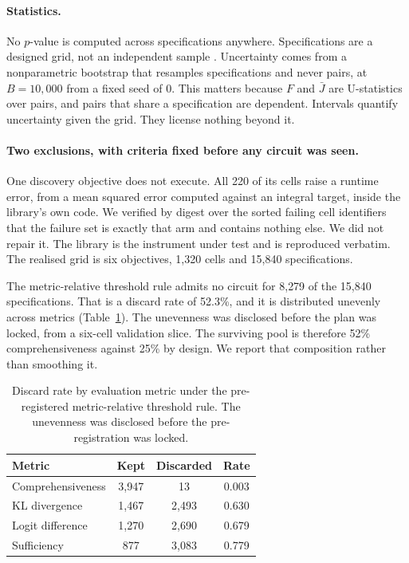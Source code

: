 \documentclass[letterpaper]{article} %
\begin{document}
\paragraph{Statistics.}
No $p$-value is computed across specifications anywhere. Specifications are a
designed grid, not an independent sample \citep{steegen2016,simonsohn2020}.
Uncertainty comes from a nonparametric bootstrap that resamples specifications
and never pairs, at $B = 10{,}000$ from a fixed seed of 0. This matters because $F$ and $\bar{J}$ are
U-statistics over pairs, and pairs that share a specification are dependent.
Intervals quantify uncertainty given the grid. They license nothing beyond it.

\paragraph{Two exclusions, with criteria fixed before any circuit was seen.}
One discovery objective does not execute. All 220 of its cells raise a runtime
error, from a mean squared error computed against an integral target, inside the
library's own code. We verified by digest over the sorted failing cell
identifiers that the failure set is exactly that arm and contains nothing else.
We did not repair it. The library is the instrument under test and is reproduced
verbatim. The realised grid is six objectives, 1{,}320 cells and 15{,}840
specifications.

The metric-relative threshold rule admits no circuit for 8{,}279 of the 15{,}840
specifications. That is a discard rate of 52.3\%, and it is distributed unevenly
across metrics (Table~\ref{tab:discard}). The unevenness was disclosed before the
plan was locked, from a six-cell validation slice. The surviving pool is
therefore 52\% comprehensiveness against 25\% by design. We report that
composition rather than smoothing it.

\begin{table}[t]
\centering
\caption{Discard rate by evaluation metric under the pre-registered
metric-relative threshold rule. The unevenness was disclosed before the
pre-registration was locked.}
\label{tab:discard}
\begin{tabular}{lccc}
\toprule
Metric & Kept & Discarded & Rate \\
\midrule
Comprehensiveness & 3{,}947 & 13 & 0.003 \\
KL divergence & 1{,}467 & 2{,}493 & 0.630 \\
Logit difference & 1{,}270 & 2{,}690 & 0.679 \\
Sufficiency & 877 & 3{,}083 & 0.779 \\
\bottomrule
\end{tabular}
\end{table}
\end{document}
